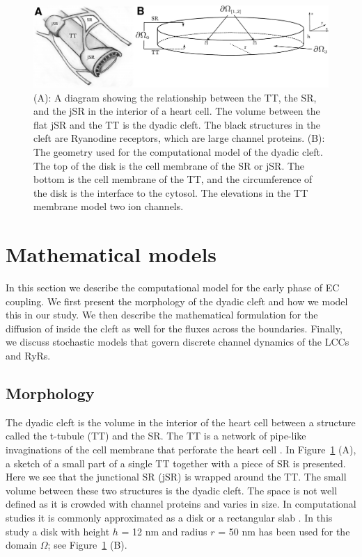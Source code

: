 \begin{figure}
  \center
  \includegraphics[width=\largefig]{chapters/hake/pdf/morphology}
  \caption[The dyadic cleft]{(A): A diagram showing the
    relationship between the TT, the SR, and the jSR in the interior
    of a heart cell. The volume between the flat jSR and the TT is the
    dyadic cleft. The black structures in the cleft are Ryanodine
    receptors, which are large channel proteins. (B): The
    geometry used for the computational model of the dyadic cleft. The
    top of the disk is the cell membrane of the SR or jSR. The bottom
    is the cell membrane of the TT, and the circumference of the disk
    is the interface to the cytosol. The elevations in the TT membrane
    model two \Ca ion channels.}
\label{fig:hake:morphology}
\end{figure}

\section{Mathematical models}
\label{sec:hake:mathematical-models}

In this section we describe the computational model for the early
phase of EC coupling. We first present the morphology of the dyadic
cleft and how we model this in our study. We then describe the
mathematical formulation for the diffusion of \Ca inside the cleft as
well for the \Ca fluxes across the boundaries. Finally, we discuss
stochastic models that govern discrete channel dynamics of the LCCs
and RyRs.

\subsection{Morphology}
\label{sec:hake:morphology}
  

The dyadic cleft is the volume in the interior of the heart cell
between a structure called the t-tubule (TT) and the SR. The TT is a
network of pipe-like invaginations of the cell membrane that perforate
the heart cell \citep{SoellerCannell1999}. In
Figure~\ref{fig:hake:morphology} (A), a sketch of a small part of
a single TT together with a piece of SR is presented. Here we see that
the junctional SR (jSR) is wrapped around the TT. The small volume
between these two structures is the dyadic cleft. The space is not
well defined as it is crowded with channel proteins and varies in
size. In computational studies it is commonly approximated as a disk
or a rectangular slab
\citep{PeskoffPostLanger1992,SoellerCannell1997,KohSrinivasanChingEtAl2006,
  TanskanenGreensteinChenEtAl2007}. In this study a disk with height
$h$ = 12 nm and radius $r$ = 50 nm has been used for the domain
$\Omega$; see Figure~\ref{fig:hake:morphology} (B).

